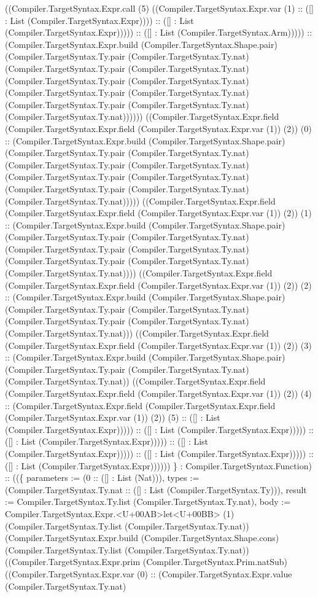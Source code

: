 \documentclass[11pt]{article}
\begin{document}
((Compiler.TargetSyntax.Expr.call (5) ((Compiler.TargetSyntax.Expr.var (1) :: ([] : List (Compiler.TargetSyntax.Expr)))) :: ([] : List (Compiler.TargetSyntax.Expr))))) :: ([] : List (Compiler.TargetSyntax.Arm))))) :: (Compiler.TargetSyntax.Expr.build (Compiler.TargetSyntax.Shape.pair) (Compiler.TargetSyntax.Ty.pair (Compiler.TargetSyntax.Ty.nat) (Compiler.TargetSyntax.Ty.pair (Compiler.TargetSyntax.Ty.nat) (Compiler.TargetSyntax.Ty.pair (Compiler.TargetSyntax.Ty.nat) (Compiler.TargetSyntax.Ty.pair (Compiler.TargetSyntax.Ty.nat) (Compiler.TargetSyntax.Ty.pair (Compiler.TargetSyntax.Ty.nat) (Compiler.TargetSyntax.Ty.nat)))))) ((Compiler.TargetSyntax.Expr.field (Compiler.TargetSyntax.Expr.field (Compiler.TargetSyntax.Expr.var (1)) (2)) (0) :: (Compiler.TargetSyntax.Expr.build (Compiler.TargetSyntax.Shape.pair) (Compiler.TargetSyntax.Ty.pair (Compiler.TargetSyntax.Ty.nat) (Compiler.TargetSyntax.Ty.pair (Compiler.TargetSyntax.Ty.nat) (Compiler.TargetSyntax.Ty.pair (Compiler.TargetSyntax.Ty.nat) (Compiler.TargetSyntax.Ty.pair (Compiler.TargetSyntax.Ty.nat) (Compiler.TargetSyntax.Ty.nat))))) ((Compiler.TargetSyntax.Expr.field (Compiler.TargetSyntax.Expr.field (Compiler.TargetSyntax.Expr.var (1)) (2)) (1) :: (Compiler.TargetSyntax.Expr.build (Compiler.TargetSyntax.Shape.pair) (Compiler.TargetSyntax.Ty.pair (Compiler.TargetSyntax.Ty.nat) (Compiler.TargetSyntax.Ty.pair (Compiler.TargetSyntax.Ty.nat) (Compiler.TargetSyntax.Ty.pair (Compiler.TargetSyntax.Ty.nat) (Compiler.TargetSyntax.Ty.nat)))) ((Compiler.TargetSyntax.Expr.field (Compiler.TargetSyntax.Expr.field (Compiler.TargetSyntax.Expr.var (1)) (2)) (2) :: (Compiler.TargetSyntax.Expr.build (Compiler.TargetSyntax.Shape.pair) (Compiler.TargetSyntax.Ty.pair (Compiler.TargetSyntax.Ty.nat) (Compiler.TargetSyntax.Ty.pair (Compiler.TargetSyntax.Ty.nat) (Compiler.TargetSyntax.Ty.nat))) ((Compiler.TargetSyntax.Expr.field (Compiler.TargetSyntax.Expr.field (Compiler.TargetSyntax.Expr.var (1)) (2)) (3) :: (Compiler.TargetSyntax.Expr.build (Compiler.TargetSyntax.Shape.pair) (Compiler.TargetSyntax.Ty.pair (Compiler.TargetSyntax.Ty.nat) (Compiler.TargetSyntax.Ty.nat)) ((Compiler.TargetSyntax.Expr.field (Compiler.TargetSyntax.Expr.field (Compiler.TargetSyntax.Expr.var (1)) (2)) (4) :: (Compiler.TargetSyntax.Expr.field (Compiler.TargetSyntax.Expr.field (Compiler.TargetSyntax.Expr.var (1)) (2)) (5) :: ([] : List (Compiler.TargetSyntax.Expr))))) :: ([] : List (Compiler.TargetSyntax.Expr))))) :: ([] : List (Compiler.TargetSyntax.Expr))))) :: ([] : List (Compiler.TargetSyntax.Expr))))) :: ([] : List (Compiler.TargetSyntax.Expr))))) :: ([] : List (Compiler.TargetSyntax.Expr)))))) \} : Compiler.TargetSyntax.Function) :: ((\{ parameters := (0 :: ([] : List (Nat))), types := (Compiler.TargetSyntax.Ty.nat :: ([] : List (Compiler.TargetSyntax.Ty))), result := Compiler.TargetSyntax.Ty.list (Compiler.TargetSyntax.Ty.nat), body := Compiler.TargetSyntax.Expr.<U+00AB>let<U+00BB> (1) (Compiler.TargetSyntax.Ty.list (Compiler.TargetSyntax.Ty.nat)) (Compiler.TargetSyntax.Expr.build (Compiler.TargetSyntax.Shape.cons) (Compiler.TargetSyntax.Ty.list (Compiler.TargetSyntax.Ty.nat)) ((Compiler.TargetSyntax.Expr.prim (Compiler.TargetSyntax.Prim.natSub) ((Compiler.TargetSyntax.Expr.var (0) :: (Compiler.TargetSyntax.Expr.value (Compiler.TargetSyntax.Ty.nat) 
\end{document}
